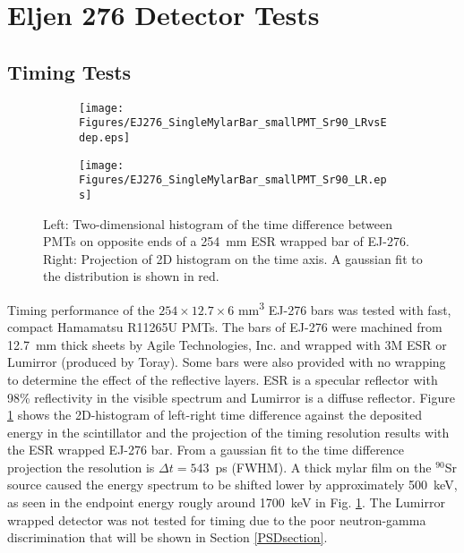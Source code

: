 \section{Eljen 276 Detector Tests}

 \subsection{Timing Tests}
\begin{figure}[hbt]
  \centering
  \begin{subfigure}{0.5\linewidth}
    \raggedleft
    \texttt{[image: Figures/EJ276\_SingleMylarBar\_smallPMT\_Sr90\_LRvsEdep.eps]}
  \end{subfigure}%
  \begin{subfigure}{0.5\linewidth}
    \raggedright
    \texttt{[image: Figures/EJ276\_SingleMylarBar\_smallPMT\_Sr90\_LR.eps]}
  \end{subfigure}%
  \caption{Left: Two-dimensional histogram of the time difference between PMTs on opposite ends of a 254~mm ESR wrapped bar of EJ-276. Right: Projection of 2D histogram on the time axis. A gaussian fit to the distribution is shown in red.}
  \label{fig:MylarTiming}
\end{figure}
 
Timing performance of the $254\times12.7\times6$ mm\textsuperscript{3} EJ-276 bars was tested with fast, compact Hamamatsu R11265U PMTs. The bars of EJ-276 were machined from 12.7~mm thick sheets by Agile Technologies, Inc. and wrapped with 3M\textsuperscript{\texttrademark} ESR or Lumirror\textsuperscript{\texttrademark} (produced by Toray). Some bars were also provided with no wrapping to determine the effect of the reflective layers. ESR is a specular reflector with 98\% reflectivity in the visible spectrum and Lumirror\textsuperscript{\texttrademark} is a diffuse reflector. Figure \ref{fig:MylarTiming} shows the 2D-histogram of left-right time difference against the deposited energy in the scintillator and the projection of the timing resolution results with the ESR wrapped EJ-276 bar. From a gaussian fit to the time difference projection the resolution is $\Delta t=543$~ps (FWHM). A thick mylar film on the $^{90}$Sr source caused the energy spectrum to be shifted lower by approximately 500~keV, as seen in the endpoint energy rougly around 1700~keV in Fig. \ref{fig:MylarTiming}.  The Lumirror\textsuperscript{\texttrademark} wrapped detector was not tested for timing due to the poor neutron-gamma discrimination that will be shown in Section \ref{PSDsection}.

